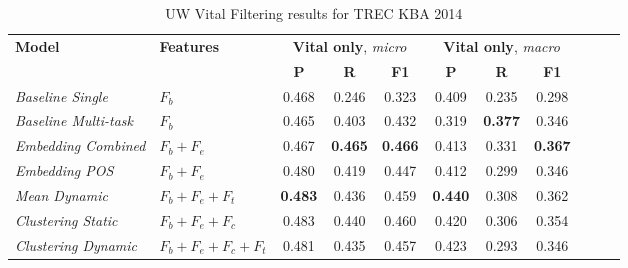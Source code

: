 \documentclass{article}
\begin{document}
\begin{table}[tb]
{\small
\begin{center}
\begin{tabular}{llccccccccc} 
\toprule
  \multirow{2}{*}{\textbf{Model}} & 
  \multirow{2}{*}{\textbf{Features}} & 
  \multicolumn{3}{c}{\textbf{Vital only}, \emph{micro}} &
  \multicolumn{3}{c}{\textbf{Vital only}, \emph{macro}}
\\ 
  \cmidrule(lr){3-5}
  \cmidrule(lr){6-8}
&   & 
  \textbf{P} & \textbf{R} & \textbf{F1} & 
  \textbf{P} & \textbf{R} & \textbf{F1} \\ 
\midrule
{\textit{Baseline Single}} & $F_b$ &
	0.468 & 0.246 & 0.323 &
  0.409 & 0.235 & 0.298 \\
{\textit{Baseline Multi-task}} & $F_b$ &
	0.465 & 0.403 & 0.432 &
	0.319 & \textbf{0.377} & 0.346 \\
{\textit{Embedding Combined}} & $F_b+F_e$ & 
	0.467 & \textbf{0.465} & \textbf{0.466} &
	0.413 & 0.331 & \textbf{0.367} \\
{\textit{Embedding POS}} & $F_b+F_e$ & 
	0.480 & 0.419 & 0.447 &
	0.412 & 0.299 & 0.346 \\
{\textit{Mean Dynamic}} & $F_b+F_e+F_t$ & 
	\textbf{0.483} & 0.436 & 0.459 &
	\textbf{0.440} & 0.308 & 0.362 \\
{\textit{Clustering Static}} & $F_b+F_e+F_c$ & 
	0.483 & 0.440 & 0.460 &
	0.420 & 0.306 & 0.354 \\
{\textit{Clustering Dynamic}} & $F_b+F_e+F_c+F_t$ & 
  0.481 & 0.435 & 0.457 &
	0.423 & 0.293 & 0.346 \\
\bottomrule
\end{tabular}
\end{center}
}
\caption{UW Vital Filtering results for TREC KBA 2014}
\label{resMacro}
\end{table}
\end{document}

